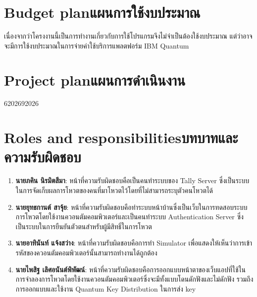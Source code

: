 \section{\ifenglish Budget plan\else แผนการใช้งบประมาณ\fi}
เนื่องจากว่าโครงงานนี้เป็นการทำงานเกี่ยวกับการใช้โปรแกรมจึงไม่จำเป็นต้องใช้งบประมาณ แต่ว่าอาจจะมีการใช้งบประมาณในการจ่ายค่าใช้บริการแพลตฟอร์ม IBM Quantum

\section{\ifenglish Project plan\else แผนการดำเนินงาน\fi}
\begin{plan}{6}{2026}{9}{2026}
\end{plan}

\section{\ifenglish Roles and responsibilities\else บทบาทและความรับผิดชอบ\fi}
\begin{enumerate}
    \item \textbf{นายภคิน นิรมิตสีมา}: หน้าที่ความรับผิดชอบคือเป็นคนทำระบบของ Tally Server ซึ่งเป็นระบบในการจัดเก็บผลการโหวตของคนที่มาโหวตไว้โดยที่ไม่สามารถระบุตัวคนโหวตได้
    \item \textbf{นายยุทธกานต์ สาจุ้ย}: หน้าที่ความรับผิดชอบคือทำระบบหน้าบ้านซึ่งเป็นเว็บในการทดสอบระบบการโหวตโดยใช้งานควอนตัมคอมพิวเตอร์และเป็นคนทำระบบ Authentication Server ซึ่งเป็นระบบในการยืนยันตัวตนสำหรับผู้มีสิทธิ์ในการโหวต
    \item \textbf{นายอาทินันท์ แจ้งสว่าง}: หน้าที่ความรับผิดชอบคือการทำ Simulator เพื่อแสดงให้เห็นว่าการเข้ารหัสของควอนตัมคอมพิวเตอร์นั้นสามารถทำงานได้ถูกต้อง
    \item \textbf{นายไพสิฐ เลิศอนันต์พิพัฒน์}: หน้าที่ความรับผิดชอบคือการออกแบบหน้าตาของเว็บแอปที่ใช้ในการจำลองการโหวตโดยใช้งานควอนตัมคอมพิวเตอร์ซึ่งจะมีทั้งแบบโดนดักฟังและไม่ดักฟัง รวมถึงการออกแบบและใช้งาน Quantum Key Distribution ในการส่ง key
\end{enumerate}

